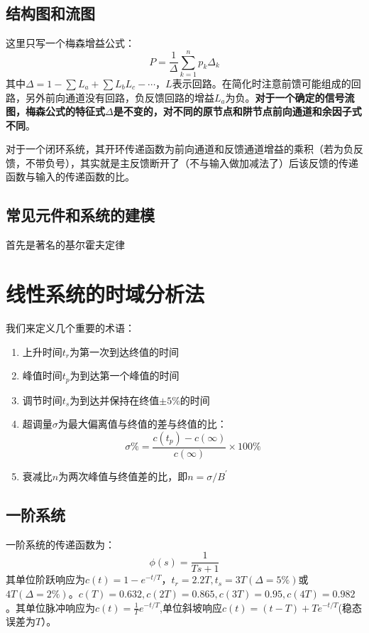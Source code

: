 \documentclass[lang=cn,10pt]{elegantbook}
\begin{document}
\section{结构图和流图}
这里只写一个梅森增益公式：
\[P=\frac{1}{\Delta} \sum \limits_{k=1}^{n} p_k \Delta_k\]
其中$\Delta = 1-\sum L_a + \sum L_b L_c -\cdots$，$L$表示回路。在简化时注意前馈可能组成的回路，另外前向通道没有回路，负反馈回路的增益$L_a$为负。\textbf{对于一个确定的信号流图，梅森公式的特征式$\Delta$是不变的，对不同的原节点和阱节点前向通道和余因子式不同}。

对于一个闭环系统，其开环传递函数为前向通道和反馈通道增益的乘积（若为负反馈，不带负号），其实就是主反馈断开了（不与输入做加减法了）后该反馈的传递函数与输入的传递函数的比。

\section{常见元件和系统的建模}

首先是著名的基尔霍夫定律

\chapter{线性系统的时域分析法}

我们来定义几个重要的术语：
\begin{definition}[性能指标]
    \begin{enumerate}
        \item 
        \textcolor[rgb]{0.75, 0.5, 0.25}{上升时间$t_r$}为第一次到达终值的时间
        \item 
        \textcolor[rgb]{0.75, 0.5, 0.25}{峰值时间$t_p$}为到达第一个峰值的时间
        \item 
        \textcolor[rgb]{0.75, 0.5, 0.25}{调节时间$t_s$}为到达并保持在终值$\pm 5\%$的时间
        \item 
        \textcolor[rgb]{0.75, 0.5, 0.25}{超调量$\sigma$}为最大偏离值与终值的差与终值的比：
        \[\sigma \%=\frac{c(t_p)-c(\infty)}{c(\infty)} \times 100\%\]
        \item 
        \textcolor[rgb]{0.75, 0.5, 0.25}{衰减比$n$}为两次峰值与终值差的比，即$n=\sigma/B^{\prime}$
    \end{enumerate}
\end{definition}

\section{一阶系统}
一阶系统的传递函数为：
\[\phi(s)=\frac{1}{Ts+1}\]
其单位阶跃响应为$c(t)=1-e^{-t/T}$，$t_r=2.2T,t_s=3T(\Delta=5\%)$或$4T(\Delta=2\%)$。$c(T)=0.632,c(2T)=0.865,c(3T)=0.95,c(4T)=0.982$。其单位脉冲响应为$c(t)=\frac{1}{T}e^{-t/T}$,单位斜坡响应$c(t)=(t-T)+Te^{-t/T}$(稳态误差为$T$）。
\end{document}
